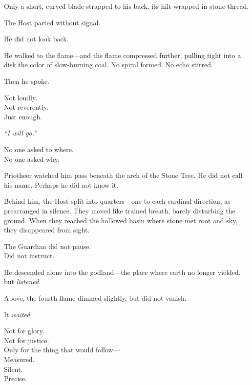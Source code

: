 \documentclass[12pt]{article}
\begin{document}
\vspace{0.5em}
Only a short, curved blade strapped to his back, its hilt wrapped in stone-thread.

\vspace{0.5em}
The Host parted without signal.

\vspace{0.5em}
He did not look back.

\vspace{0.5em}
He walked to the flame---and the flame compressed further, pulling tight into a disk the color of slow-burning coal. No spiral formed. No echo stirred.

\vspace{0.5em}
Then he spoke.

\vspace{0.5em}
Not loudly.\\
Not reverently.\\
Just enough.

\vspace{0.5em}
\textit{``I will go.''}

\vspace{0.5em}
No one asked to where.\\
No one asked why.

\vspace{0.5em}
Priotheer watched him pass beneath the arch of the Stone Tree. He did not call his name. Perhaps he did not know it.

\vspace{0.5em}
Behind him, the Host split into quarters---one to each cardinal direction, as prearranged in silence. They moved like trained breath, barely disturbing the ground. When they reached the hollowed basin where stone met root and sky, they disappeared from sight.

\vspace{0.5em}
The Guardian did not pause.\\
Did not instruct.

\vspace{0.5em}
He descended alone into the godland---the place where earth no longer yielded, but \textit{listened}.

\vspace{0.5em}
Above, the fourth flame dimmed slightly, but did not vanish.

\vspace{0.5em}
It \textit{waited}.

\vspace{0.5em}
Not for glory.\\
Not for justice.\\
Only for the thing that would follow---\\
Measured.\\
Silent.\\
Precise.
\end{document}
